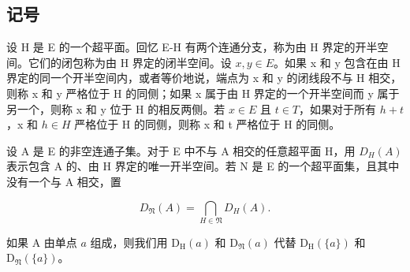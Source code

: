 \subsection{记号}

设 H 是 E 的一个超平面。回忆 E-H 有两个连通分支，称为由 H 界定的开半空间。它们的闭包称为由 H 界定的闭半空间。设 \(x, y \in E\)。如果 x 和 y 包含在由 H 界定的同一个开半空间内，或者等价地说，端点为 x 和 y 的闭线段不与 H 相交，则称 x 和 y 严格位于 H 的同侧；如果 x 属于由 H 界定的一个开半空间而 y 属于另一个，则称 x 和 y 位于 H 的相反两侧。若 \(x \in E\) 且 \(t \in T\)，如果对于所有 \(h + t\)，x 和 \(h \in H\) 严格位于 H 的同侧，则称 x 和 t 严格位于 H 的同侧。

设 A 是 E 的非空连通子集。对于 E 中不与 A 相交的任意超平面 H，用 \(D_{H}(A)\) 表示包含 A 的、由 H 界定的唯一开半空间。若 N 是 E 的一个超平面集，且其中没有一个与 A 相交，置

\[
D _ {\mathfrak {N}} (A) = \bigcap_ {H \in \mathfrak {N}} D _ {H} (A).\tag{1}
\]

如果 \(\mathrm{A}\) 由单点 \(a\) 组成，则我们用 \(\mathrm{D_H}(a)\) 和 \(\mathrm{D}_{\mathfrak{N}}(a)\) 代替 \(\mathrm{D_H}(\{a\})\) 和 \(\mathrm{D}_{\mathfrak{N}}(\{a\})\)。


